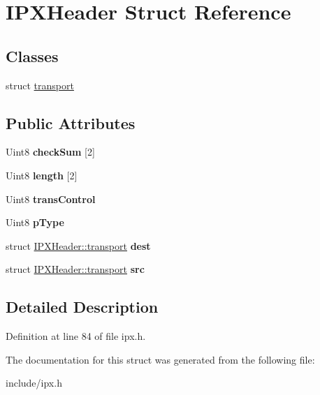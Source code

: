\hypertarget{structIPXHeader}{\section{I\-P\-X\-Header Struct Reference}
\label{structIPXHeader}
}
\subsection*{Classes}
\begin{DoxyCompactItemize}
\item 
struct \hyperlink{structIPXHeader_1_1transport}{transport}
\end{DoxyCompactItemize}
\subsection*{Public Attributes}
\begin{DoxyCompactItemize}
\item 
\hypertarget{structIPXHeader_ab2691faf0b56a10c2b76dcce0ce68129}{Uint8 {\bfseries check\-Sum} \mbox{[}2\mbox{]}}\label{structIPXHeader_ab2691faf0b56a10c2b76dcce0ce68129}

\item 
\hypertarget{structIPXHeader_a1b34bf353f97dc61fae447368300d274}{Uint8 {\bfseries length} \mbox{[}2\mbox{]}}\label{structIPXHeader_a1b34bf353f97dc61fae447368300d274}

\item 
\hypertarget{structIPXHeader_a2005eb59288b9c6b980fafe4622e89d9}{Uint8 {\bfseries trans\-Control}}\label{structIPXHeader_a2005eb59288b9c6b980fafe4622e89d9}

\item 
\hypertarget{structIPXHeader_af7e56ca4fc14136df6e6646c3d9ec3d1}{Uint8 {\bfseries p\-Type}}\label{structIPXHeader_af7e56ca4fc14136df6e6646c3d9ec3d1}

\item 
\hypertarget{structIPXHeader_ac25512dfed9828df3cd40ed47d0b933e}{struct \hyperlink{structIPXHeader_1_1transport}{I\-P\-X\-Header\-::transport} {\bfseries dest}}\label{structIPXHeader_ac25512dfed9828df3cd40ed47d0b933e}

\item 
\hypertarget{structIPXHeader_acd0033d79208388bdc116679e1d87544}{struct \hyperlink{structIPXHeader_1_1transport}{I\-P\-X\-Header\-::transport} {\bfseries src}}\label{structIPXHeader_acd0033d79208388bdc116679e1d87544}

\end{DoxyCompactItemize}


\subsection{Detailed Description}


Definition at line 84 of file ipx.\-h.



The documentation for this struct was generated from the following file\-:\begin{DoxyCompactItemize}
\item 
include/ipx.\-h\end{DoxyCompactItemize}
